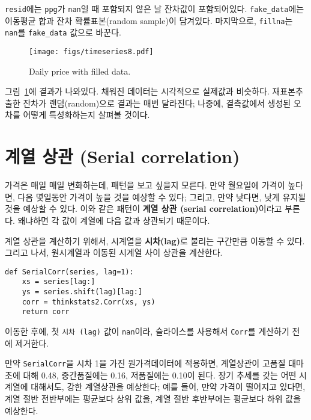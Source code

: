 {\tt resid}에는 {\tt ppg}가 {\tt nan}일 때 포함되지 않은 날 잔차값이 포함되어있다. \verb"fake_data"에는 이동평균 합과 잔차 확률표본(random sample)이 담겨있다. 마지막으로, {\tt fillna}는 {\tt nan}를 \verb"fake_data" 값으로 바꾼다.

\begin{figure}
\centerline{\texttt{[image: figs/timeseries8.pdf]}}
\caption{Daily price with filled data.}
\label{timeseries8}
\end{figure}

그림~\ref{timeseries8}에 결과가 나와있다.
채워진 데이터는 시각적으로 실제값과 비슷하다.
재표본추출한 잔차가 랜덤(random)으로 결과는 매번 달라진다; 나중에,
결측값에서 생성된 오차를 어떻게 특성화하는지 살펴볼 것이다.



\section{계열 상관 (Serial correlation)}

가격은 매일 매일 변화하는데, 패턴을 보고 싶을지 모른다.
만약 월요일에 가격이 높다면, 다음 몇일동안 가격이 높을 것을 예상할 수 있다; 그리고, 만약 낮다면, 낮게 유지될 것을 예상할 수 있다.
이와 같은 패턴이 {\bf 계열 상관 (serial correlation)}이라고 부른다. 왜냐하면 각 값이 계열에 다음 값과 상관되기 때문이다.

계열 상관을 계산하기 위해서, 시계열을 {\bf 시차(lag)}로 불리는 구간만큼 이동할 수 있다. 그리고 나서, 원시계열과 이동된 시계열 사이 상관을 계산한다.

\begin{verbatim}
def SerialCorr(series, lag=1):
    xs = series[lag:]
    ys = series.shift(lag)[lag:]
    corr = thinkstats2.Corr(xs, ys)
    return corr
\end{verbatim}

이동한 후에, 첫 {\tt 시차 (lag)} 값이 {\tt nan}이라, 슬라이스를 사용해서 {\tt Corr}를 계산하기 전에 제거한다.


만약 {\tt SerialCorr}을 시차 1을 가진 원가격데이터에 적용하면, 계열상관이 고품질 대마초에 대해 0.48, 중간품질에는 0.16, 저품질에는 0.10이 된다.
장기 추세를 갖는 어떤 시계열에 대해서도, 강한 계열상관을 예상한다; 예를 들어, 만약 가격이 떨어지고 있다면, 계열 절반 전반부에는 평균보다 상위 값을, 계열 절반 후반부에는 평균보다 하위 값을 예상한다.

